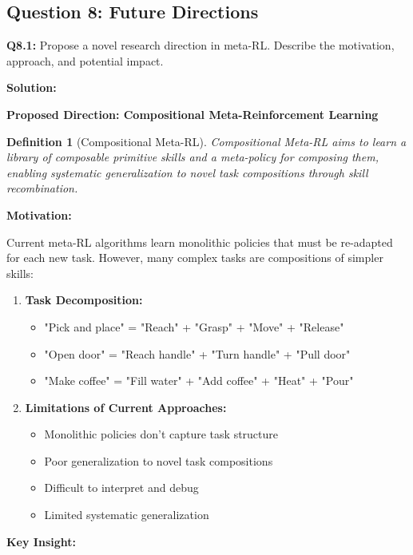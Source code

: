 \documentclass[12pt]{article}
\newcommand{\ieee}[1]{\textcolor{IEEEBlue}{\textbf{#1}}}
\newtheorem{definition}{Definition}
\begin{document}
{{			\subsection{Question 8: Future Directions}
			
			\textbf{Q8.1:} Propose a novel research direction in meta-RL. Describe the motivation, approach, and potential impact.
			
			\textbf{Solution:}
			
			\ieee{Proposed Direction: Compositional Meta-Reinforcement Learning}
			
			\begin{definition}[Compositional Meta-RL]
			Compositional Meta-RL aims to learn a library of composable primitive skills and a meta-policy for composing them, enabling systematic generalization to novel task compositions through skill recombination.
			\end{definition}
			
			\ieee{Motivation:}
			
			Current meta-RL algorithms learn monolithic policies that must be re-adapted for each new task. However, many complex tasks are compositions of simpler skills:
			
			\begin{enumerate}
				\item \textbf{Task Decomposition:}
				\begin{itemize}
					\item "Pick and place" = "Reach" + "Grasp" + "Move" + "Release"
					\item "Open door" = "Reach handle" + "Turn handle" + "Pull door"
					\item "Make coffee" = "Fill water" + "Add coffee" + "Heat" + "Pour"
				\end{itemize}
				
				\item \textbf{Limitations of Current Approaches:}
				\begin{itemize}
					\item Monolithic policies don't capture task structure
					\item Poor generalization to novel task compositions
					\item Difficult to interpret and debug
					\item Limited systematic generalization
				\end{itemize}
			\end{enumerate}
			
			\ieee{Key Insight:}
			
}}
\end{document}
